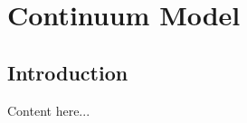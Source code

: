 \documentclass[../proposal]{subfiles}
\begin{document}
\chapter{Continuum Model}

\section{Introduction}
Content here...
\end{document}
